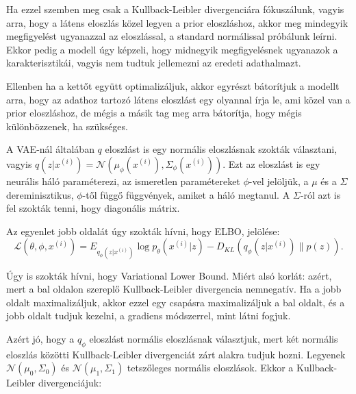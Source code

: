 \documentclass[12pt]{amsart}
\begin{document}
\vspace{5pt}

Ha ezzel szemben meg csak a Kullback-Leibler divergenciára
fókuszálunk, vagyis arra, hogy a látens eloszlás közel
legyen a prior eloszláshoz, akkor meg mindegyik megfigyelést
ugyanazzal az eloszlással, a standard normálissal próbálunk
leírni. Ekkor pedig a modell úgy képzeli, hogy midnegyik
megfigyelésnek ugyanazok a karakterisztikái, vagyis nem
tudtuk jellemezni az eredeti adathalmazt.

\vspace{5pt}

Ellenben ha a kettőt együtt optimalizáljuk, akkor egyrészt
bátorítjuk a modellt arra, hogy az adathoz tartozó látens
eloszlást egy olyannal írja le, ami közel van a prior
eloszláshoz, de mégis a másik tag meg arra bátorítja, hogy
mégis különbözzenek, ha szükséges. 

\vspace{5pt}

A VAE-nál általában $q$ eloszlást is egy normális
eloszlásnak szokták választani, vagyis
$q(z| x^{(i)}) = \mathcal{N}(\mu_\phi(x^{(i)}),
\Sigma_\phi(x^{(i)}))$. Ezt az eloszlást is egy neurális
háló paraméterezi, az ismeretlen paramétereket $\phi$-vel
jelöljük, a $\mu$ és a $\Sigma$ dereminisztikus, $\phi$-től
függő függvények, amiket a háló megtanul. A $\Sigma$-ról azt
is fel szokták tenni, hogy diagonális mátrix.

\vspace{5pt}

Az egyenlet jobb oldalát úgy szokták hívni, hogy ELBO,
jelölése:
\[
    \mathcal{L}(\theta, \phi, x^{(i)})= E_{q_{\phi}(z|
      x^{(i)})}\log p_{\theta}(x^{(i)}| z) -
    D_{KL}(q_{\phi}(z| x^{(i)})\| p(z)).
\]

\vspace{5pt}

Úgy is szokták hívni, hogy Variational Lower Bound. Miért
alsó korlát: azért, mert a bal oldalon szereplő
Kullback-Leibler divergencia nemnegatív. Ha a jobb oldalt
maximalizáljuk, akkor ezzel egy csapásra maximalizáljuk a
bal oldalt, és a jobb oldalt tudjuk kezelni, a gradiens
módszerrel, mint látni fogjuk.

\vspace{5pt}

Azért jó, hogy a $q_\phi$ eloszlást normális eloszlásnak
választjuk, mert két normális eloszlás közötti
Kullback-Leibler divergenciát zárt alakra tudjuk
hozni. Legyenek
$\mathcal{N}(\mu_0, \Sigma_0)$ és $\mathcal{N}(\mu_1,
\Sigma_1)$ tetszőleges normális eloszlások. Ekkor a
Kullback-Leibler divergenciájuk:
\end{document}

